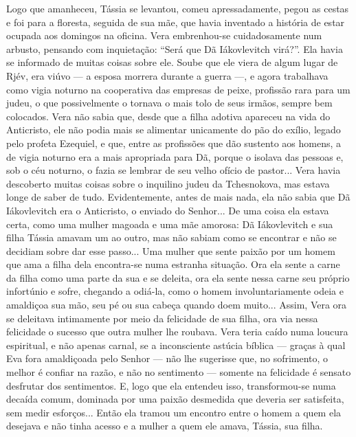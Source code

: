 Logo que amanheceu, Tássia se levantou, comeu apressadamente, pegou as
cestas e foi para a floresta, seguida de sua mãe, que havia inventado a
história de estar ocupada aos domingos na oficina. Vera embrenhou-se
cuidadosamente num arbusto, pensando com inquietação: ``Será que Dã
Iákovlevitch virá?''. Ela havia se informado de muitas coisas sobre ele.
Soube que ele viera de algum lugar de Rjév, era viúvo --- a esposa
morrera durante a guerra ---, e agora trabalhava como vigia noturno na
cooperativa das empresas de peixe, profissão rara para um judeu, o que
possivelmente o tornava o mais tolo de seus irmãos, sempre bem
colocados. Vera não sabia que, desde que a filha adotiva apareceu na
vida do Anticristo, ele não podia mais se alimentar unicamente do pão do
exílio, legado pelo profeta Ezequiel, e que, entre as profissões que dão
sustento aos homens, a de vigia noturno era a mais apropriada para Dã,
porque o isolava das pessoas e, sob o céu noturno, o fazia se lembrar de
seu velho ofício de pastor... Vera havia descoberto muitas coisas sobre
o inquilino judeu da Tchesnokova, mas estava longe de saber de tudo.
Evidentemente, antes de mais nada, ela não sabia que Dã Iákovlevitch era
o Anticristo, o enviado do Senhor... De uma coisa ela estava certa, como
uma mulher magoada e uma mãe amorosa: Dã Iákovlevitch e sua filha Tássia
amavam um ao outro, mas não sabiam como se encontrar e não se decidiam
sobre dar esse passo... Uma mulher que sente paixão por um homem que ama
a filha dela encontra-se numa estranha situação. Ora ela sente a carne
da filha como uma parte da sua e se deleita, ora ela sente nessa carne
seu próprio infortúnio e sofre, chegando a odiá-la, como o homem
involuntariamente odeia e amaldiçoa sua mão, seu pé ou sua cabeça quando
doem muito... Assim, Vera ora se deleitava intimamente por meio da
felicidade de sua filha, ora via nessa felicidade o sucesso que outra
mulher lhe roubava. Vera teria caído numa loucura espiritual, e não
apenas carnal, se a inconsciente astúcia bíblica --- graças à qual Eva
fora amaldiçoada pelo Senhor --- não lhe sugerisse que, no sofrimento, o
melhor é confiar na razão, e não no sentimento --- somente na felicidade
é sensato desfrutar dos sentimentos. E, logo que ela entendeu isso,
transformou-se numa decaída comum, dominada por uma paixão desmedida que
deveria ser satisfeita, sem medir esforços... Então ela tramou um
encontro entre o homem a quem ela desejava e não tinha acesso e a mulher
a quem ele amava, Tássia, sua filha.


